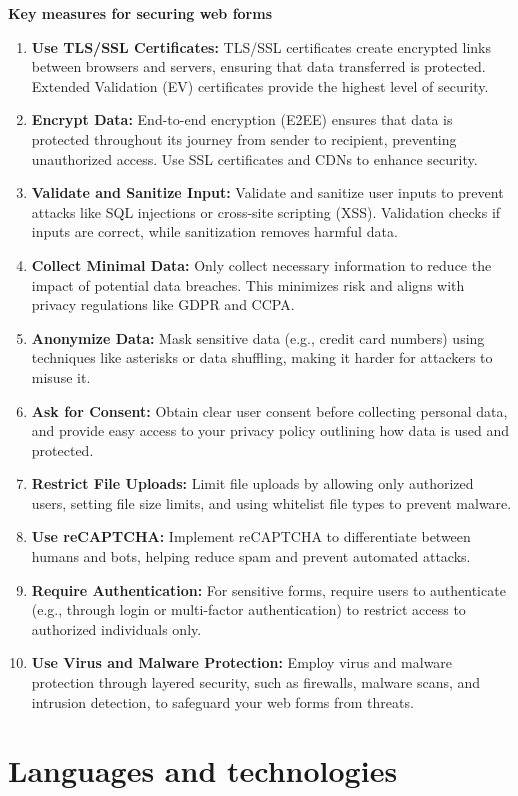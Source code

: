 \documentclass[12pt,oneside,openright,a4paper]{cpe-english-project}
\begin{document}
\textbf{Key measures for securing web forms}
\begin{enumerate}
	\item \textbf{Use TLS/SSL Certificates:} TLS/SSL certificates create encrypted links between browsers and servers, ensuring that data transferred is protected. Extended Validation (EV) certificates provide the highest level of security.
	\item \textbf{Encrypt Data:} End-to-end encryption (E2EE) ensures that data is protected throughout its journey from sender to recipient, preventing unauthorized access. Use SSL certificates and CDNs to enhance security.
	\item \textbf{Validate and Sanitize Input:} Validate and sanitize user inputs to prevent attacks like SQL injections or cross-site scripting (XSS). Validation checks if inputs are correct, while sanitization removes harmful data.
	\item \textbf{Collect Minimal Data:} Only collect necessary information to reduce the impact of potential data breaches. This minimizes risk and aligns with privacy regulations like GDPR and CCPA.
	\item \textbf{Anonymize Data:} Mask sensitive data (e.g., credit card numbers) using techniques like asterisks or data shuffling, making it harder for attackers to misuse it.
	\item \textbf{Ask for Consent:} Obtain clear user consent before collecting personal data, and provide easy access to your privacy policy outlining how data is used and protected.
	\item \textbf{Restrict File Uploads:} Limit file uploads by allowing only authorized users, setting file size limits, and using whitelist file types to prevent malware.
	\item \textbf{Use reCAPTCHA:} Implement reCAPTCHA to differentiate between humans and bots, helping reduce spam and prevent automated attacks.
	\item \textbf{Require Authentication:} For sensitive forms, require users to authenticate (e.g., through login or multi-factor authentication) to restrict access to authorized individuals only.
	\item \textbf{Use Virus and Malware Protection:} Employ virus and malware protection through layered security, such as firewalls, malware scans, and intrusion detection, to safeguard your web forms from threats.
\end{enumerate}

\section{Languages and technologies}
\end{document}
